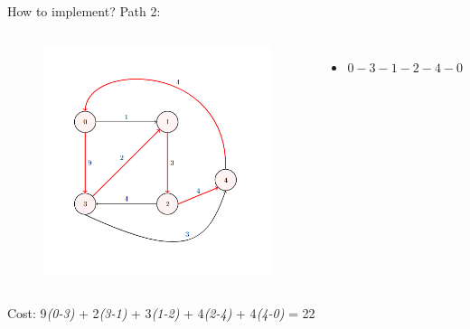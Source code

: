 \documentclass{beamer}
\begin{document}
\begin{frame}{How to implement?}
    Path 2:
    \begin{columns}
    \begin{figure}[h]
        \centering
        \includegraphics[scale=0.6]{g3.png}
    \end{figure}
    \begin{itemize}
        \item<1-> $0-3-1-2-4-0$
    \end{itemize}
    \end{columns}
    \begin{center}Cost: 9\emph{(0-3)} + 2\emph{(3-1)} + 3\emph{(1-2)} + 4\emph{(2-4)} + 4\emph{(4-0)} = 22\end{center}
\end{frame}
\end{document}
